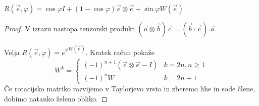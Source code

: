 \begin{izrek}
  $R(\vec{e}, \varphi) = \cos \varphi I + (1 - \cos \varphi) \vec{e} \otimes
  \vec{e} + \sin \varphi W(\vec{e})$
\end{izrek}

\begin{proof}
  V izrazu nastopa tenzorski produkt $(\vec{a} \otimes \vec{b}) \vec{c} =
  (\vec{b} \cdot \vec{c}) . \vec{a}$.

  Velja $R(\vec{e}, \varphi) = e^{\varphi W(\vec{e})}$.
  Kratek račun pokaže
  \[
	W^k =
	\begin{cases}
	  (-1)^{n+1} (\vec{e} \otimes \vec{e} - I) & k = 2n, n \ge 1 \\
	  (-1)^n W & k = 2n+1
	\end{cases}
  \]
  Če rotacijsko matriko razvijemo v Taylorjevo vrsto in zberemo lihe in sode
  člene, dobimo natanko želeno obliko.
\end{proof}


